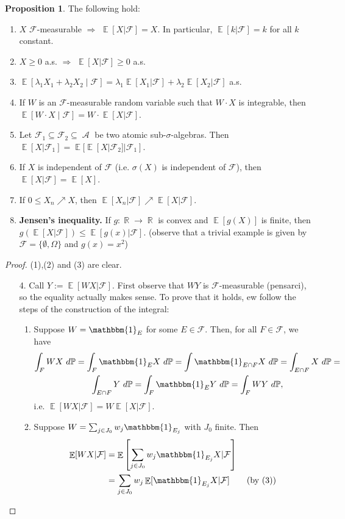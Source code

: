 \documentclass[12pt,a4paper]{report}
\theoremstyle{definition}
\newtheorem{proposition}[theorem]{Proposition}
\theoremstyle{num.custom-title}
\DeclareMathOperator{\A}{\mathcal{A}}
\DeclareMathOperator{\E}{\mathbb{E}}
\DeclareMathOperator{\R}{\mathbb{R}}
\DeclareMathOperator{\imp}{\Rightarrow}
\DeclareMathOperator{\sse}{\subseteq}
\newcommand{\F}{\mathcal{F}}
\renewcommand{\1}{\mathbbm{1}}
\renewcommand{\P}{\mathbb{P}}
\begin{document}
\begin{proposition}
The following hold:
\begin{enumerate}
\item $X$ $\F$-measurable $\imp$ $\E[X|\F]=X$. In particular, $\E[k|\F]=k$ for all $k$ constant.
\item $X \geq 0$ a.s. $\imp$ $\E[X|\F] \geq 0$ a.s.
\item $\E[\lambda_1 X_1 + \lambda_2 X_2 \mid \F] = \lambda_1 \E[X_1|\F] + \lambda_2\E[X_2|\F]$ a.s.
\item If $W$ is an $\F$-measurable random variable such that $W \cdot X$ is integrable, then $\E[W \cdot X \mid \F] = W \cdot \E[X|\F]$.
\item Let $\F_1 \sse \F_2 \sse \A$ be two atomic sub-$\sigma$-algebras. Then $\E[X|\F_1] = \E[\E[X|\F_2]|\F_1]$.
\item If $X$ is independent of $\F$ (i.e. $\sigma(X)$ is independent of $\F$), then $\E[X|\F]=\E[X]$.
\item If $0 \leq X_n \nearrow X$, then $\E[X_n|\F] \nearrow \E[X|\F]$.
\item \textbf{Jensen's inequality.} If $g \colon \R \to \R$ is convex and $\E[g(X)]$ is finite, then $g(\E[X|\F]) \leq \E[g(x)|\F]$. (observe that a trivial example is given by $\F=\{\emptyset,\Omega\}$ and $g(x)=x^2$)
\end{enumerate}
\begin{proof}
(1),(2) and (3) are clear.
\begin{enumerate}
\item[4.] Call $Y := \E[WX|\F]$. First observe that $WY$ is $\F$-measurable (pensarci), so the equality actually makes sense. To prove that it holds, ew follow the steps of the construction of the integral:
\begin{enumerate}
\item Suppose $W = \1_E$ for some $E \in \F$. Then, for all $F \in \F$, we have
\begin{multline*}
\int_F WX \ d\P = \int_F \1_E X \ d\P = \int \1_{E \cap F} X \ d\P = \int_{E \cap F} X \ d\P = \\
\int_{E \cap F} Y \ d\P = \int_F \1_E Y \ d\P = \int_F WY \ d\P,
\end{multline*}
i.e. $\E[WX|\F]=W\E[X|\F]$.
\item Suppose $W = \sum_{j \in J_0} w_j \1_{E_j}$ with $J_0$ finite. Then
\begin{align*}
\E[WX|\F]
&= \E \left[ \sum_{j \in J_0} w_j \1_{E_j} X | \F \right] \\
&= \sum_{j \in J_0} w_j \E[\1_{E_j} X | \F] \tag{by (3)} \\

\end{align*}
\end{enumerate}
\end{enumerate}
\end{proof}
\end{proposition}
\end{document}
